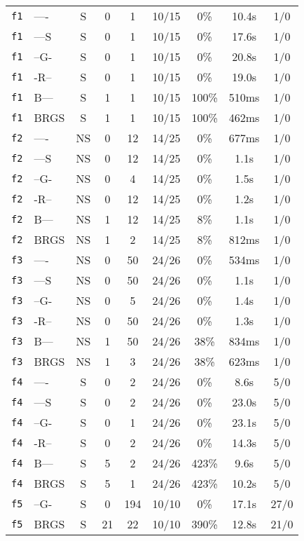 \begin{tabular}{llccccccc}
\texttt{f1} & ---- & S & 0 & 1 & 10/15 & 0\% & 10.4s & 1/0 \\
\texttt{f1} & ---S & S & 0 & 1 & 10/15 & 0\% & 17.6s & 1/0 \\
\texttt{f1} & --G- & S & 0 & 1 & 10/15 & 0\% & 20.8s & 1/0 \\
\texttt{f1} & -R-- & S & 0 & 1 & 10/15 & 0\% & 19.0s & 1/0 \\
\texttt{f1} & B--- & S & 1 & 1 & 10/15 & 100\% & 510ms & 1/0 \\
\texttt{f1} & BRGS & S & 1 & 1 & 10/15 & 100\% & 462ms & 1/0 \\
\texttt{f2} & ---- & NS & 0 & 12 & 14/25 & 0\% & 677ms & 1/0 \\
\texttt{f2} & ---S & NS & 0 & 12 & 14/25 & 0\% & 1.1s & 1/0 \\
\texttt{f2} & --G- & NS & 0 & 4 & 14/25 & 0\% & 1.5s & 1/0 \\
\texttt{f2} & -R-- & NS & 0 & 12 & 14/25 & 0\% & 1.2s & 1/0 \\
\texttt{f2} & B--- & NS & 1 & 12 & 14/25 & 8\% & 1.1s & 1/0 \\
\texttt{f2} & BRGS & NS & 1 & 2 & 14/25 & 8\% & 812ms & 1/0 \\
\texttt{f3} & ---- & NS & 0 & 50 & 24/26 & 0\% & 534ms & 1/0 \\
\texttt{f3} & ---S & NS & 0 & 50 & 24/26 & 0\% & 1.1s & 1/0 \\
\texttt{f3} & --G- & NS & 0 & 5 & 24/26 & 0\% & 1.4s & 1/0 \\
\texttt{f3} & -R-- & NS & 0 & 50 & 24/26 & 0\% & 1.3s & 1/0 \\
\texttt{f3} & B--- & NS & 1 & 50 & 24/26 & 38\% & 834ms & 1/0 \\
\texttt{f3} & BRGS & NS & 1 & 3 & 24/26 & 38\% & 623ms & 1/0 \\
\texttt{f4} & ---- & S & 0 & 2 & 24/26 & 0\% & 8.6s & 5/0 \\
\texttt{f4} & ---S & S & 0 & 2 & 24/26 & 0\% & 23.0s & 5/0 \\
\texttt{f4} & --G- & S & 0 & 1 & 24/26 & 0\% & 23.1s & 5/0 \\
\texttt{f4} & -R-- & S & 0 & 2 & 24/26 & 0\% & 14.3s & 5/0 \\
\texttt{f4} & B--- & S & 5 & 2 & 24/26 & 423\% & 9.6s & 5/0 \\
\texttt{f4} & BRGS & S & 5 & 1 & 24/26 & 423\% & 10.2s & 5/0 \\
\texttt{f5} & --G- & S & 0 & 194 & 10/10 & 0\% & 17.1s & 27/0 \\
\texttt{f5} & BRGS & S & 21 & 22 & 10/10 & 390\% & 12.8s & 21/0 \\

\end{tabular}

